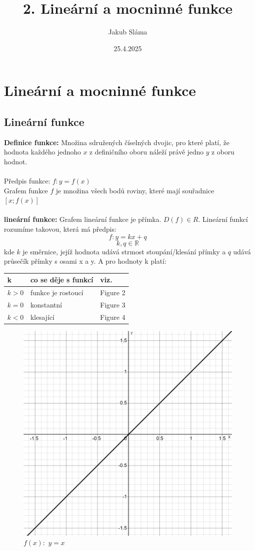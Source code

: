 \title{2. Lineární a mocninné funkce}
\author{Jakub Sláma}
\date{25.4.2025}

\maketitle

\section{Lineární a mocninné funkce}

\subsection{Lineární funkce}
\textbf{Definice funkce:} Množina sdružených číselných dvojic, pro které platí, že hodnota každého jednoho $x$ z definičního oboru náleží právě jedno $y$ z oboru hodnot. \\ \\ 
Předpis funkce: $f: y=f(x)$ \\
Grafem funkce $f$ je množina všech bodů roviny, které mají souřadnice $[x;f(x)]$  \\ \\
\textbf{lineární funkce:}
Grafem lineární funkce je přímka. $D(f) \in R$. 
Lineární funkcí rozumíme takovou, která má předpis:
$$
    f:y=kx+q
$$
$$
    k,q \in \mathbb{R}  
$$
kde $k$ je směrnice, jejíž hodnota udává strmost stoupání/klesání přímky a $q$ udává průsečík přímky s osami x a y. A pro hodnoty k platí: \\


\begin{tabularx}{0.8\textwidth} { 
  | >{\raggedright\arraybackslash}X 
  | >{\centering\arraybackslash}X 
  | >{\raggedleft\arraybackslash}X | }
 \hline
  k & co se děje s funkcí & viz.\\
 \hline
 $k>0$      &   funkce je rostoucí  & Figure 2\\
 $k=0$      &   konstantní         & Figure 3\\
 $k<0$      &   klesající          & Figure 4\\
\hline
\end{tabularx}


\begin{figure}[H]
        \centering
        \includegraphics[width=0.4\linewidth]{img/2_graf_y=x.png}
        \caption{$f(x):$ $y=x$}
        \label{fig:enter-label}
    \end{figure}

